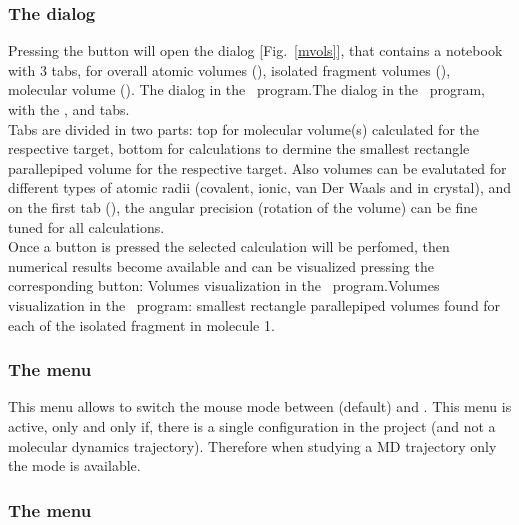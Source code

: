 \newpage

\subsubsection*{The  dialog}
\label{volw}

Pressing the  button will open the  dialog [Fig.~\ref{mvols}], that contains a notebook with 3 tabs, for overall atomic volumes (), 
isolated fragment volumes (), molecular volume (). 
{The  dialog in the \atomes\ program.}{The  dialog in the \atomes\ program, with the ,  and  tabs.}
\\Tabs are divided in two parts: top for molecular volume(s) calculated for the respective target, 
bottom for calculations to dermine the smallest rectangle parallepiped volume for the respective target. 
Also volumes can be evalutated for different types of atomic radii (covalent, ionic, van Der Waals and in crystal), 
and on the first tab (), the angular precision (rotation of the volume) can be fine tuned for all calculations. \\
Once a  button is pressed the selected calculation will be perfomed, then numerical results become available and can be visualized 
pressing the corresponding  button: 
{Volumes visualization in the \atomes\ program.}{Volumes visualization in the \atomes\ program: smallest rectangle parallepiped volumes found for each of the isolated fragment in molecule 1.}
\clearpage

\newpage

\subsubsection*{The  menu}

This menu allows to switch the mouse mode between  (default) and . 
This menu is active, only and only if, there is a single configuration in the project (and not a molecular dynamics trajectory). 
Therefore when studying a MD trajectory only the  mode is available. 

\subsubsection*{The  menu}

